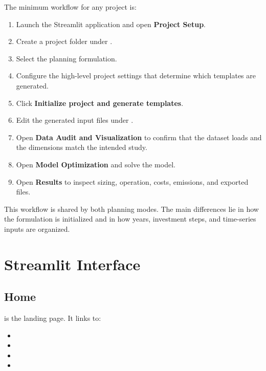\documentclass[11pt,a4paper]{report}
\begin{document}
The minimum workflow for any project is:

\begin{enumerate}[leftmargin=1.5em]
  \item Launch the Streamlit application and open \textbf{Project Setup}.
  \item Create a project folder under .
  \item Select the planning formulation.
  \item Configure the high-level project settings that determine which templates are generated.
  \item Click \textbf{Initialize project and generate templates}.
  \item Edit the generated input files under .
  \item Open \textbf{Data Audit and Visualization} to confirm that the dataset loads and the dimensions match the intended study.
  \item Open \textbf{Model Optimization} and solve the model.
  \item Open \textbf{Results} to inspect sizing, operation, costs, emissions, and exported files.
\end{enumerate}

This workflow is shared by both planning modes. The main differences lie in how the formulation is initialized and in how years, investment steps, and time-series inputs are organized.

\chapter{Streamlit Interface}\label{sec:streamlit-interface}

\section{Home}

 is the landing page. It links to:

\begin{itemize}[leftmargin=1.5em]
  \item {}
  \item {}
  \item {}
  \item {}
\end{itemize}
\end{document}
